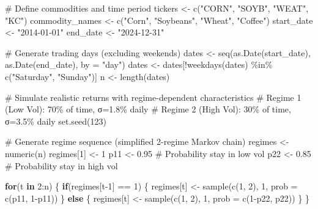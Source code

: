 \documentclass[
  10pt,
  a4paper,
]{article}
\newenvironment{Shaded}{\begin{snugshade}}{\end{snugshade}}
\newcommand{\AttributeTok}[1]{\textcolor[rgb]{0.40,0.45,0.13}{#1}}
\newcommand{\CommentTok}[1]{\textcolor[rgb]{0.37,0.37,0.37}{#1}}
\newcommand{\ControlFlowTok}[1]{\textcolor[rgb]{0.00,0.23,0.31}{\textbf{#1}}}
\newcommand{\DecValTok}[1]{\textcolor[rgb]{0.68,0.00,0.00}{#1}}
\newcommand{\FloatTok}[1]{\textcolor[rgb]{0.68,0.00,0.00}{#1}}
\newcommand{\FunctionTok}[1]{\textcolor[rgb]{0.28,0.35,0.67}{#1}}
\newcommand{\NormalTok}[1]{\textcolor[rgb]{0.00,0.23,0.31}{#1}}
\newcommand{\OtherTok}[1]{\textcolor[rgb]{0.00,0.23,0.31}{#1}}
\newcommand{\SpecialCharTok}[1]{\textcolor[rgb]{0.37,0.37,0.37}{#1}}
\newcommand{\StringTok}[1]{\textcolor[rgb]{0.13,0.47,0.30}{#1}}
\begin{document}
\begin{Shaded}
\begin{Highlighting}[]
\CommentTok{\# Define commodities and time period}
\NormalTok{tickers }\OtherTok{\textless{}{-}} \FunctionTok{c}\NormalTok{(}\StringTok{"CORN"}\NormalTok{, }\StringTok{"SOYB"}\NormalTok{, }\StringTok{"WEAT"}\NormalTok{, }\StringTok{"KC"}\NormalTok{)}
\NormalTok{commodity\_names }\OtherTok{\textless{}{-}} \FunctionTok{c}\NormalTok{(}\StringTok{"Corn"}\NormalTok{, }\StringTok{"Soybeans"}\NormalTok{, }\StringTok{"Wheat"}\NormalTok{, }\StringTok{"Coffee"}\NormalTok{)}
\NormalTok{start\_date }\OtherTok{\textless{}{-}} \StringTok{"2014{-}01{-}01"}
\NormalTok{end\_date }\OtherTok{\textless{}{-}} \StringTok{"2024{-}12{-}31"}

\CommentTok{\# Generate trading days (excluding weekends)}
\NormalTok{dates }\OtherTok{\textless{}{-}} \FunctionTok{seq}\NormalTok{(}\FunctionTok{as.Date}\NormalTok{(start\_date), }\FunctionTok{as.Date}\NormalTok{(end\_date), }\AttributeTok{by =} \StringTok{"day"}\NormalTok{)}
\NormalTok{dates }\OtherTok{\textless{}{-}}\NormalTok{ dates[}\SpecialCharTok{!}\FunctionTok{weekdays}\NormalTok{(dates) }\SpecialCharTok{\%in\%} \FunctionTok{c}\NormalTok{(}\StringTok{"Saturday"}\NormalTok{, }\StringTok{"Sunday"}\NormalTok{)]}
\NormalTok{n }\OtherTok{\textless{}{-}} \FunctionTok{length}\NormalTok{(dates)}

\CommentTok{\# Simulate realistic returns with regime{-}dependent characteristics}
\CommentTok{\# Regime 1 (Low Vol): 70\% of time, σ=1.8\% daily}
\CommentTok{\# Regime 2 (High Vol): 30\% of time, σ=3.5\% daily}
\FunctionTok{set.seed}\NormalTok{(}\DecValTok{123}\NormalTok{)}

\CommentTok{\# Generate regime sequence (simplified 2{-}regime Markov chain)}
\NormalTok{regimes }\OtherTok{\textless{}{-}} \FunctionTok{numeric}\NormalTok{(n)}
\NormalTok{regimes[}\DecValTok{1}\NormalTok{] }\OtherTok{\textless{}{-}} \DecValTok{1}
\NormalTok{p11 }\OtherTok{\textless{}{-}} \FloatTok{0.95}  \CommentTok{\# Probability stay in low vol}
\NormalTok{p22 }\OtherTok{\textless{}{-}} \FloatTok{0.85}  \CommentTok{\# Probability stay in high vol}

\ControlFlowTok{for}\NormalTok{(t }\ControlFlowTok{in} \DecValTok{2}\SpecialCharTok{:}\NormalTok{n) \{}
  \ControlFlowTok{if}\NormalTok{(regimes[t}\DecValTok{{-}1}\NormalTok{] }\SpecialCharTok{==} \DecValTok{1}\NormalTok{) \{}
\NormalTok{    regimes[t] }\OtherTok{\textless{}{-}} \FunctionTok{sample}\NormalTok{(}\FunctionTok{c}\NormalTok{(}\DecValTok{1}\NormalTok{, }\DecValTok{2}\NormalTok{), }\DecValTok{1}\NormalTok{, }\AttributeTok{prob =} \FunctionTok{c}\NormalTok{(p11, }\DecValTok{1}\SpecialCharTok{{-}}\NormalTok{p11))}
\NormalTok{  \} }\ControlFlowTok{else}\NormalTok{ \{}
\NormalTok{    regimes[t] }\OtherTok{\textless{}{-}} \FunctionTok{sample}\NormalTok{(}\FunctionTok{c}\NormalTok{(}\DecValTok{1}\NormalTok{, }\DecValTok{2}\NormalTok{), }\DecValTok{1}\NormalTok{, }\AttributeTok{prob =} \FunctionTok{c}\NormalTok{(}\DecValTok{1}\SpecialCharTok{{-}}\NormalTok{p22, p22))}
\NormalTok{  \}}
\NormalTok{\}}


\end{Highlighting}
\end{Shaded}
\end{document}
